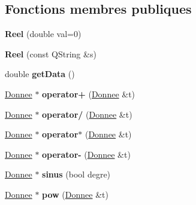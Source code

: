 \subsection*{Fonctions membres publiques}
\begin{DoxyCompactItemize}
\item 
\hypertarget{class_reel_a10756227cbba51f1b70ad8ec1ac42f8b}{{\bfseries Reel} (double val=0)}\label{class_reel_a10756227cbba51f1b70ad8ec1ac42f8b}

\item 
\hypertarget{class_reel_aa44af559ad39232b46771a245e39172e}{{\bfseries Reel} (const Q\-String \&s)}\label{class_reel_aa44af559ad39232b46771a245e39172e}

\item 
\hypertarget{class_reel_a3965202bfe687a1f171c34cac92e1992}{double {\bfseries get\-Data} ()}\label{class_reel_a3965202bfe687a1f171c34cac92e1992}

\item 
\hypertarget{class_reel_a2bca56beb307d648f1d2a1acf2b832df}{\hyperlink{class_donnee}{Donnee} $\ast$ {\bfseries operator+} (\hyperlink{class_donnee}{Donnee} \&t)}\label{class_reel_a2bca56beb307d648f1d2a1acf2b832df}

\item 
\hypertarget{class_reel_acf3908140032378509352422477f3528}{\hyperlink{class_donnee}{Donnee} $\ast$ {\bfseries operator/} (\hyperlink{class_donnee}{Donnee} \&t)}\label{class_reel_acf3908140032378509352422477f3528}

\item 
\hypertarget{class_reel_a37ce50db66988d5922c93199ef625551}{\hyperlink{class_donnee}{Donnee} $\ast$ {\bfseries operator$\ast$} (\hyperlink{class_donnee}{Donnee} \&t)}\label{class_reel_a37ce50db66988d5922c93199ef625551}

\item 
\hypertarget{class_reel_afceac072f4568830292ae1ad6e5a17d0}{\hyperlink{class_donnee}{Donnee} $\ast$ {\bfseries operator-\/} (\hyperlink{class_donnee}{Donnee} \&t)}\label{class_reel_afceac072f4568830292ae1ad6e5a17d0}

\item 
\hypertarget{class_reel_adb33802e084c7a21ac42e98cf347a7e6}{\hyperlink{class_donnee}{Donnee} $\ast$ {\bfseries sinus} (bool degre)}\label{class_reel_adb33802e084c7a21ac42e98cf347a7e6}

\item 
\hypertarget{class_reel_ae07e77487c1223e485113e670a91be8b}{\hyperlink{class_donnee}{Donnee} $\ast$ {\bfseries pow} (\hyperlink{class_donnee}{Donnee} \&t)}\label{class_reel_ae07e77487c1223e485113e670a91be8b}


\end{DoxyCompactItemize}
